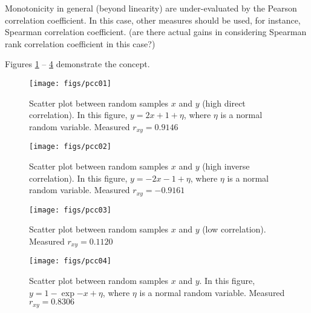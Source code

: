 Monotonicity in general (beyond linearity) are under-evaluated by the Pearson correlation coefficient. In this case, other measures should be used, for instance, Spearman correlation coefficient. (are there actual gains in considering Spearman rank correlation coefficient in this case?)

Figures \ref{fig:pcc01} -- \ref{fig:pcc04} demonstrate the concept.
\begin{figure}
	\texttt{[image: figs/pcc01]}
	\caption{Scatter plot between random samples $x$ and $y$ (high direct correlation). In this figure, $y = 2x+1+\eta$, where $\eta$ is a normal random variable. Measured $r_{xy}=0.9146$}
	\label{fig:pcc01}
\end{figure}

\begin{figure}
	\texttt{[image: figs/pcc02]}
	\caption{Scatter plot between random samples $x$ and $y$ (high inverse correlation). In this figure, $y = -2x-1+\eta$, where $\eta$ is a normal random variable. Measured $r_{xy}=-0.9161$}
	\label{fig:pcc02}
\end{figure}

\begin{figure}
	\texttt{[image: figs/pcc03]}
	\caption{Scatter plot between random samples $x$ and $y$ (low correlation). Measured $r_{xy}=0.1120$}
	\label{fig:pcc03}
\end{figure}

\begin{figure}
	\texttt{[image: figs/pcc04]}
	\caption{Scatter plot between random samples $x$ and $y$. In this figure, $y = 1-\exp{-x}+\eta$, where $\eta$ is a normal random variable. Measured $r_{xy}=0.8306$}
	\label{fig:pcc04}
\end{figure}
%
%
